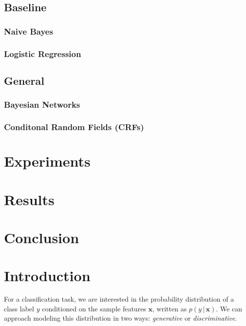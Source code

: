 \documentclass{article}
\begin{document}
\subsection{Baseline}
\subsubsection{Naive Bayes}
\subsubsection{Logistic Regression}
\subsection{General}
\subsubsection{Bayesian Networks}
\subsubsection{Conditonal Random Fields (CRFs)}

\section{Experiments}

\section{Results}

\section{Conclusion}




\section{Introduction}
For a classification task, we are interested in the probability distribution
of a class label $y$ conditioned on the sample features $\mathbf{x}$,
written as $p(y\,|\,\mathbf{x})$. We can approach modeling this
distribution in two ways: \textit{generative} or \textit{discriminative}.
\end{document}
